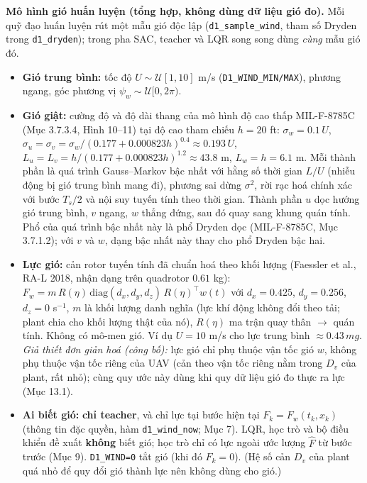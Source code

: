 \documentclass[11pt]{article}
\newcommand{\T}{^{\!\top}}
\begin{document}
\textbf{Mô hình gió huấn luyện (tổng hợp, không dùng dữ liệu gió đo).} Mỗi quỹ đạo huấn luyện rút một mẫu
gió độc lập (\texttt{d1\_sample\_wind}, tham số Dryden trong \texttt{d1\_dryden}); trong pha SAC, teacher và
LQR song song dùng \emph{cùng} mẫu gió đó.
\begin{itemize}[leftmargin=1.4em,itemsep=1pt]
\item \textbf{Gió trung bình:} tốc độ $U\sim\mathcal U[1,10]$ m/s (\texttt{D1\_WIND\_MIN/MAX}), phương ngang,
góc phương vị $\psi_w\sim\mathcal U[0,2\pi)$.
\item \textbf{Gió giật:} cường độ và độ dài thang của mô hình độ cao thấp MIL-F-8785C (Mục 3.7.3.4, Hình 10--11) tại độ cao tham chiếu
$h=20$ ft: $\sigma_w=0.1\,U$, $\sigma_u=\sigma_v=\sigma_w/(0.177+0.000823h)^{0.4}\approx0.193\,U$,
$L_u=L_v=h/(0.177+0.000823h)^{1.2}\approx43.8$ m, $L_w=h=6.1$ m. Mỗi thành phần là quá trình Gauss--Markov
bậc nhất với hằng số thời gian $L/U$ (nhiễu động bị gió trung bình mang đi), phương sai dừng $\sigma^2$, rời
rạc hoá chính xác với bước $T_s/2$ và nội suy tuyến tính theo thời gian. Thành phần $u$ dọc hướng gió trung
bình, $v$ ngang, $w$ thẳng đứng, sau đó quay sang khung quán tính. Phổ của quá trình bậc nhất này là phổ Dryden
dọc (MIL-F-8785C, Mục 3.7.1.2); với $v$ và $w$, dạng bậc nhất này thay cho phổ Dryden bậc hai.
\item \textbf{Lực gió:} cản rotor tuyến tính đã chuẩn hoá theo khối lượng (Faessler et al., RA-L 2018, nhận
dạng trên quadrotor $0.61$ kg): $F_w=m\,R(\eta)\,\mathrm{diag}(d_x,d_y,d_z)\,R(\eta)\T w(t)$ với
$d_x=0.425$, $d_y=0.256$, $d_z=0$ s$^{-1}$, $m$ là khối lượng danh nghĩa (lực khí động không đổi theo tải;
plant chia cho khối lượng thật của nó), $R(\eta)$ ma trận quay thân $\to$ quán tính. Không có mô-men gió. Ví dụ
$U=10$ m/s cho lực trung bình $\approx0.43\,mg$. \emph{Giả thiết đơn giản hoá (công bố):} lực gió chỉ phụ
thuộc vận tốc gió $w$, không phụ thuộc vận tốc riêng của UAV (cản theo vận tốc riêng nằm trong $D_v$ của
plant, rất nhỏ); cùng quy ước này dùng khi quy dữ liệu gió đo thực ra lực (Mục 13.1).
\item \textbf{Ai biết gió:} \textbf{chỉ teacher}, và chỉ lực tại bước hiện tại $F_k=F_w(t_k,x_k)$ (thông
tin đặc quyền, hàm \texttt{d1\_wind\_now}; Mục 7). LQR, học trò và bộ điều khiển đề xuất \textbf{không}
biết gió; học trò chỉ có lực ngoài ước lượng $\hat F$ từ bước trước (Mục 9).
\texttt{D1\_WIND=0} tắt gió (khi đó $F_k=0$). (Hệ số cản $D_v$ của plant quá nhỏ để quy đổi gió thành lực nên
không dùng cho gió.)
\end{itemize}
\end{document}
